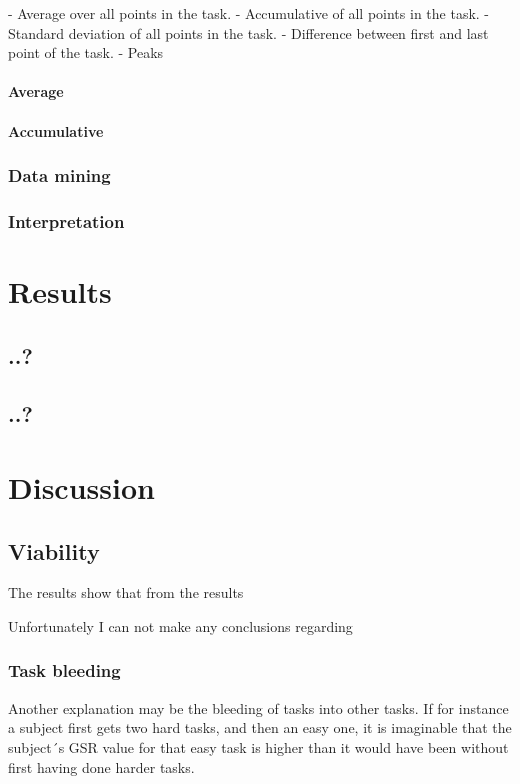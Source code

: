\documentclass[12pt,fleqn,leqno,letterpaper]{article}
\begin{document}
- Average over all points in the task.
- Accumulative of all points in the task.
- Standard deviation of all points in the task.
- Difference between first and last point of the task.
- Peaks

\paragraph{Average}

\paragraph{Accumulative}




\subsubsection{Data mining}
\subsubsection{Interpretation}

\section{Results}

\subsection{..?}
\subsection{..?}

\section{Discussion}
\subsection{Viability}
The results show that from the results 

Unfortunately I can not make any conclusions regarding 

\subsubsection{Task bleeding}
Another explanation may be the bleeding of tasks into other tasks. If for instance a subject first gets two hard tasks, and then an easy one, it is imaginable that the subject´s GSR value for that easy task is higher than it would have been without first having done harder tasks. 
\end{document}
